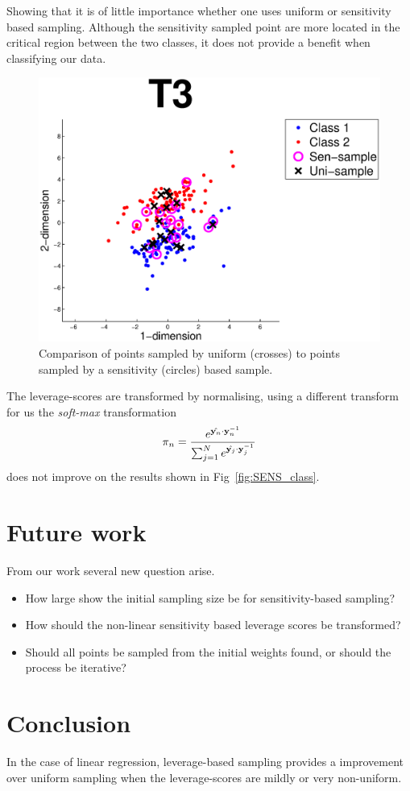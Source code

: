 \documentclass{article}
\begin{document}
Showing that it is of little importance whether one uses uniform or sensitivity based sampling. Although the sensitivity sampled point are more located in the critical region between the two classes, it does not provide a benefit when classifying our data.

\begin{figure}[t]
\centering
\includegraphics[width=.8\linewidth]{images/selectionSen.eps}
\caption{Comparison of points sampled by uniform (crosses) to points sampled by a sensitivity (circles) based sample.}
\label{fig:selectionSen}
\end{figure}	

The leverage-scores are transformed by normalising, using a different transform for us the \emph{soft-max} transformation
\[
\pi_n = \dfrac{e^{\hat{{\bf y}_n} \cdot {\bf y}_n^{-1}}}{\sum_{j = 1}^N e^{\hat{{\bf y}_j} \cdot {\bf y}_j^{-1}}}
\]
does not improve on the results shown in Fig~\ref{fig:SENS_class}. 





%
\section{Future work}
From our work several new question arise.
\begin{itemize}
\item How large show the initial sampling size be for sensitivity-based sampling?
\item How should the non-linear sensitivity based leverage scores be transformed?
\item Should all points be sampled from the initial weights found, or should the process be iterative?
\end{itemize}
%
\section{Conclusion}
In the case of linear regression, leverage-based sampling provides a improvement over uniform sampling when the leverage-scores are mildly or very non-uniform.
\end{document}
